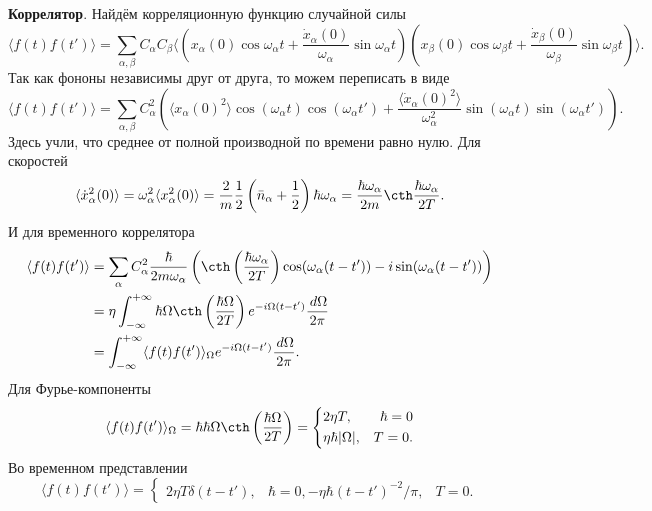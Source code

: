 \textbf{Коррелятор}. Найдём корреляционную функцию случайной силы
\begin{equation*}
	\langle f(t) f(t')\rangle = \sum_{\alpha, \beta} C_\alpha C_\beta \langle \left(
	x_\alpha(0) \cos \omega_\alpha t + \frac{\dot{x}_\alpha(0)}{\omega_\alpha} \sin \omega_\alpha t
	\right)\left(
	x_\beta(0) \cos \omega_\beta t + \frac{\dot{x}_\beta(0)}{\omega_\beta} \sin \omega_\beta t
	\right)
	\rangle.
\end{equation*}
Так как фононы независимы друг от друга, то можем переписать в виде
\begin{equation*}
	\langle f(t) f(t')\rangle = \sum_{\alpha, \beta} C_\alpha^2 \left(
		\langle x_\alpha(0)^2\rangle \cos(\omega_\alpha t) \cos(\omega_\alpha t') + \frac{\langle \dot{x}_\alpha(0)^2\rangle}{\omega_\alpha^2} \sin(\omega_\alpha t) \sin(\omega_\alpha t')
	\right).
\end{equation*}
Здесь учли, что среднее от полной производной по времени равно нулю. Для скоростей
\begin{equation*}
	\langle \dot{x}_\alpha^2(0)\rangle = \omega_\alpha^2 \langle x_\alpha^2(0)\rangle = \frac{2}{m} \frac{1}{2} \left(\bar{n}_\alpha + \frac{1}{2}\right) \hbar \omega_\alpha = \frac{\hbar \omega_\alpha}{2m} \cth \frac{\hbar \omega_\alpha}{2T}.
\end{equation*}
И для временного коррелятора
\begin{align*}
	\langle f(t) f(t')\rangle 
	&= \sum_\alpha C_\alpha^2 \frac{\hbar}{2 m \omega_\alpha} \left(
		\cth\left(\frac{\hbar \omega_\alpha}{2 T}\right) \cos(\omega_\alpha(t-t')) - i \sin(\omega_\alpha(t-t'))
	\right) 
	\\ &= 
	\eta \int_{-\infty}^{+\infty} \hbar \Omega \cth\left(\frac{\hbar \Omega}{2T}\right) e^{-i\Omega(t-t')} \frac{\d \Omega}{2\pi}
	\\ &= 
	\int_{-\infty}^{+\infty} \langle f(t) f(t')\rangle _\Omega e^{-i\Omega(t-t')} \frac{\d \Omega}{2\pi}.
\end{align*}
Для Фурье-компоненты
\begin{equation*}
	\langle f(t) f(t')\rangle_\Omega = \hbar \hbar \Omega \cth\left(\frac{\hbar \Omega}{2T}\right) = \left\{\begin{aligned}
	    &2 \eta T, &\hbar=0\\
	    &\eta \hbar |\Omega|, &T=0.
	\end{aligned}\right.
\end{equation*}
Во временном представлении
\begin{equation*}
	\langle f(t) f(t')\rangle = \left\{\begin{aligned}
	    2 \eta T \delta(t-t'), &\hbar=0,
	    -\eta \hbar  (t-t')^{-2} /\pi, &T=0.
	\end{aligned}\right.
\end{equation*}
